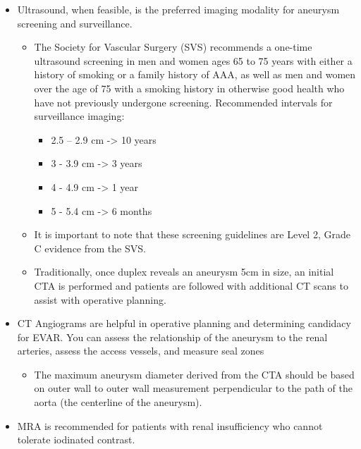 \documentclass[
]{book}
\providecommand{\tightlist}{%
  \setlength{\itemsep}{0pt}\setlength{\parskip}{0pt}}
\begin{document}
\begin{itemize}
\item
  Ultrasound, when feasible, is the preferred imaging modality for
  aneurysm screening and surveillance.

  \begin{itemize}
  \item
    The Society for Vascular Surgery (SVS) recommends a one-time
    ultrasound screening in men and women ages 65 to 75 years with
    either a history of smoking or a family history of AAA, as well
    as men and women over the age of 75 with a smoking history in
    otherwise good health who have not previously undergone
    screening. \citep{chaikofSocietyVascularSurgery2018a} Recommended
    intervals for surveillance imaging:

    \begin{itemize}
    \item
      2.5 -- 2.9 cm -\textgreater{} 10 years
    \item
      3 - 3.9 cm -\textgreater{} 3 years
    \item
      4 - 4.9 cm -\textgreater{} 1 year
    \item
      5 - 5.4 cm -\textgreater{} 6 months
    \end{itemize}
  \item
    It is important to note that these screening guidelines are
    Level 2, Grade C evidence from the SVS.
  \item
    Traditionally, once duplex reveals an aneurysm 5cm in size, an
    initial CTA is performed and patients are followed with
    additional CT scans to assist with operative planning.
  \end{itemize}
\item
  CT Angiograms are helpful in operative planning and determining
  candidacy for EVAR. You can assess the relationship of the aneurysm
  to the renal arteries, assess the access vessels, and measure seal
  zones

  \begin{itemize}
  \tightlist
  \item
    The maximum aneurysm diameter derived from the CTA should be
    based on outer wall to outer wall measurement perpendicular to
    the path of the aorta (the centerline of the aneurysm).
  \end{itemize}
\item
  MRA is recommended for patients with renal insufficiency who cannot
  tolerate iodinated contrast.
\end{itemize}
\end{document}
